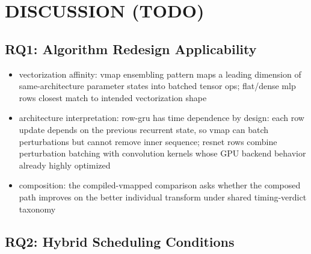 \documentclass[conference]{IEEEtran}
\newcommand{\tightlist}{\setlength{\itemsep}{0pt}\setlength{\parskip}{0pt}}
\begin{document}
\section{DISCUSSION (TODO)}\label{discussion}

\subsection{RQ1: Algorithm Redesign Applicability}\label{rq1-algorithm-redesign-applicability}

\begin{itemize}\tightlist
  \item vectorization affinity:
    vmap ensembling pattern maps a leading
    dimension of same-architecture parameter states into
    batched tensor ops; flat/dense mlp rows closest match to
    intended vectorization shape
  \item architecture interpretation: row-gru has time
    dependence by design: each row update depends on the
    previous recurrent state, so vmap can batch perturbations
    but cannot remove inner sequence; resnet rows combine
    perturbation batching with convolution kernels whose GPU
    backend behavior already highly optimized
  \item composition: the compiled-vmapped comparison asks
    whether the composed path improves on the better individual
    transform under shared timing-verdict taxonomy
\end{itemize}

\subsection{RQ2: Hybrid Scheduling Conditions}\label{rq2-hybrid-scheduling-conditions}
\end{document}
